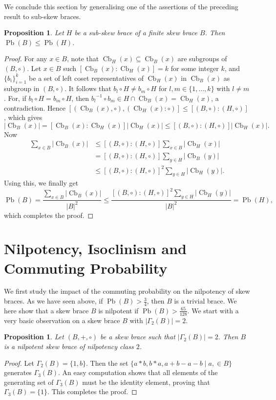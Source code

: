 \documentclass[oneside]{amsart}
\numberwithin{equation}{section}
\theoremstyle{plain}
\newtheorem{pro}[equation]{Proposition}
\theoremstyle{definition}
\newcommand{\Cb}{\operatorname{Cb} }
\newcommand{\Pb}{\operatorname{Pb} }
\begin{document}
We conclude this section by generalising one of the assertions of the preceding result to sub-skew braces.
\begin{pro}
    Let $H$ be a sub-skew brace of a finite skew brace $B$. Then $\Pb(B) \leqslant \Pb(H)$.
\end{pro}
\begin{proof}
  For any $x \in B$, note that  $\Cb_H(x) \subseteq \Cb_B(x)$ are subgroups of $(B, \circ)$.  Let  $x \in B$ such  $[\Cb_B(x) :\Cb_H(x)] = k$ for some integer $k$, and  $\{b_i\}_{i=1}^{k}$ be a set of left coset representatives  of $\Cb_H(x)$ in $\Cb_B(x)$ as subgroup in $(B, \circ)$. It follows that $b_l\circ H \ne  b_m \circ H$ for $l, m \in \{1, \ldots,k\}$ with $l\neq m$. For, if  $b_l\circ H=b_m\circ H$, then ${b_l}^{-1} \circ b_m\in H \cap \Cb_B(x) = \Cb_H(x)$, a contradiction. Hence
    $[(\Cb_B(x),\circ),(\Cb_H(x): \circ)]\leqslant [(B,\circ):(H,\circ)]$, which gives
    $$|\Cb_B(x)|=[\Cb_B(x) :  \Cb_H(x)] |\Cb_H(x)| \leqslant [(B,\circ):(H,\circ)] |\Cb_H(x)|.$$
   Now
    \begin{align*}
        \sum_{x\in B}|\Cb_B(x)| & \leqslant [(B,\circ):(H,\circ)]\sum_{x\in B}|\Cb_H(x)|\\
        &= [(B,\circ):(H,\circ)]\sum_{y\in H}|\Cb_B(y)|\\
        & \leqslant {[(B,\circ):(H,\circ)]}^2\sum_{y\in H}|\Cb_H(y)|.
    \end{align*}
 Using this, we finally get
        $$\Pb(B)=\frac{\sum_{x\in B}|\Cb_B(x)|}{|B|^2}\leqslant \frac{{[(B,\circ):(H,\circ)]}^2\sum_{y\in H}|\Cb_H(y)|}{|B|^2}=\Pb(H),$$
        which completes the proof.
\end{proof}




\section{Nilpotency, Isoclinism and Commuting Probability}

We first study the impact of the commuting probability on the nilpotency of skew braces. As we have seen above, if $\Pb(B) > \frac{3}{4}$, then $B$ is a trivial brace. We here show that a skew brace $B$ is nilpotent if  $\Pb(B) > \frac{65}{128}$.  We start with a very basic observation on a skew brace $B$ with $|\Gamma_2(B)| = 2$. 

\begin{pro}
 Let $(B, +, \circ)$ be a skew brace such that  $|\Gamma_2(B)| = 2$. Then $B$ is a  nilpotent skew brace of nilpotency class $2$.
\end{pro}
\begin{proof}
   Let $\Gamma_2(B) = \{1, b\}$. Then the set $\{a*b, b*a, a+b-a-b \mid a, \in B\}$  generates $\Gamma_3(B)$.  An easy computation shows that all elements of the generating set of $\Gamma_3(B)$ must be the identity element, proving that $\Gamma_3(B) =\{1\}$. This completes the proof.
\end{proof}    
\end{document}
